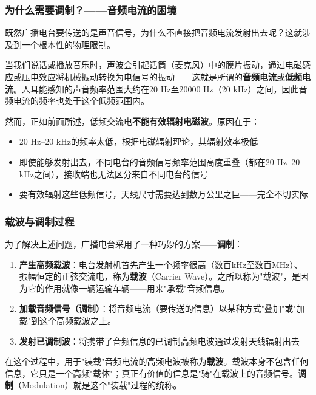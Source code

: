 \documentclass[12pt,UTF8]{ctexbook}
\begin{document}
\subsubsection{为什么需要调制？——音频电流的困境}

既然广播电台要传送的是声音信号，为什么不直接把音频电流发射出去呢？这就涉及到一个根本性的物理限制。

当我们说话或播放音乐时，声波会引起话筒（麦克风）中的膜片振动，通过电磁感应或压电效应将机械振动转换为电信号的振动——这就是所谓的\textbf{音频电流}或\textbf{低频电流}。人耳能感知的声音频率范围大约在20 Hz至20000 Hz（20 kHz）之间，因此音频电流的频率也处于这个低频范围内。

然而，正如前面所述，低频交流电\textbf{不能有效辐射电磁波}。原因在于：
\begin{itemize}
	\item 20 Hz--20 kHz的频率太低，根据电磁辐射理论，其辐射效率极低
	\item 即使能够发射出去，不同电台的音频信号频率范围高度重叠（都在20 Hz--20 kHz之间），接收端也无法区分来自不同电台的信号
	\item 要有效辐射这些低频信号，天线尺寸需要达到数万公里之巨——完全不切实际
\end{itemize}

\subsubsection{载波与调制过程}

为了解决上述问题，广播电台采用了一种巧妙的方案——\textbf{调制}：

\begin{enumerate}
	\item \textbf{产生高频载波}：电台发射机首先产生一个频率很高（数百kHz至数百MHz）、振幅恒定的正弦交流电，称为\textbf{载波}（Carrier Wave）。之所以称为"载波"，是因为它的作用就像一辆运输车辆——用来"承载"音频信息。
	
	\item \textbf{加载音频信号（调制）}：将音频电流（要传送的信息）以某种方式"叠加"或"加载"到这个高频载波之上。
	
	\item \textbf{发射已调制波}：将携带了音频信息的已调制高频电波通过发射天线辐射出去
\end{enumerate}

在这个过程中，用于"装载"音频电流的高频电波被称为\textbf{载波}。载波本身不包含任何信息，它只是一个高频"载体"；真正有价值的信息是"骑"在载波上的音频信号。\textbf{调制}（Modulation）就是这个"装载"过程的统称。
\end{document}
